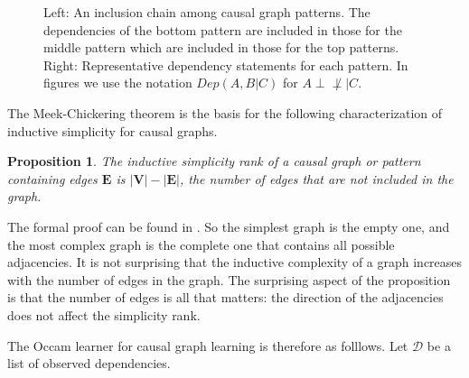 \documentclass{elsarticle}%
\newtheorem{proposition}[theorem]{Proposition}
\newcommand{\set}[1]{\mathbf{#1}}
\newcommand{\dep}{\ensuremath{{\perp{}\!\!\!\!\!\!\!\not  \perp{}}}}
\newcommand{\V}{\mathbf{V}}
\newcommand{\A}{A}
\newcommand{\D}{\mathcal{D}}
\begin{document}
\begin{figure}[htbp]
\centering
{}
\caption{Left: An inclusion chain among causal graph patterns. The dependencies of the bottom pattern are included in those for the middle pattern which are included in those for the top patterns. Right: Representative dependency statements for each pattern. In figures we use the notation $Dep(A,B|C)$ for $\A\dep |C$.}%
\label{fig:bn-inclusion}%
\end{figure}


The Meek-Chickering theorem is the basis for the following characterization of inductive simplicity for causal graphs. 

\begin{proposition}
The inductive simplicity rank of a causal graph or pattern containing edges $\set{E}$ is $|\V|-|\set{E}|$, the number of edges that are {\em not} included in the graph.
\end{proposition}
 
 The formal proof can be found in \cite{Schulte2010}. So the simplest graph is the empty one, and the most complex graph is the complete one that contains all possible adjacencies. It is not surprising that the inductive complexity of a graph increases with the number of edges in the graph. The surprising aspect of the proposition is that the number of edges is all that matters: the direction of the adjacencies does not affect the simplicity rank. 

The Occam learner for causal graph learning is therefore as folllows. Let $\D$ be a list of observed dependencies.
\end{document}
